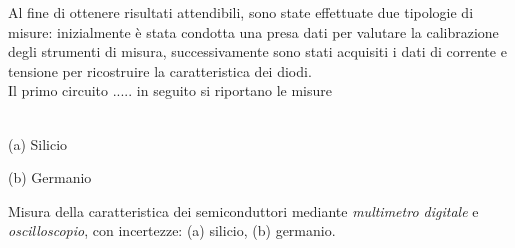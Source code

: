 \documentclass[@MAIN@]{subfiles}
\begin{document}
    Al fine di ottenere risultati attendibili, sono state effettuate due tipologie
    di misure: inizialmente è stata condotta una presa dati per valutare la
    calibrazione degli strumenti di misura, successivamente sono stati acquisiti
    i dati di corrente e tensione per ricostruire la caratteristica dei diodi. \\

    Il primo circuito .....
    in seguito si riportano le misure
    \\ \\
    \begin{center}
        
    \end{center}


    \begin{table}[ht]
        \centering
        \begin{minipage}[t]{.45\textwidth}
            \centering
            
            \captionsetup{justification=centering} %
            \caption*{(a) Silicio} %
        \end{minipage}
        \hfill
        {\begin{minipage}[t]{.45\textwidth}
             \centering
             
             \captionsetup{justification=centering} %
             \caption*{(b) Germanio} %
        \end{minipage}}

        \vspace{0.5em} %

        \caption{Misura della caratteristica dei semiconduttori mediante \textit{multimetro digitale} e \textit{oscilloscopio}, con incertezze: (a) silicio, (b) germanio.}
        \label{tab:tabelle_semiconduttori}

    \end{table}
\end{document}
